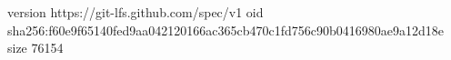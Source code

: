version https://git-lfs.github.com/spec/v1
oid sha256:f60e9f65140fed9aa042120166ac365cb470c1fd756c90b0416980ae9a12d18e
size 76154
